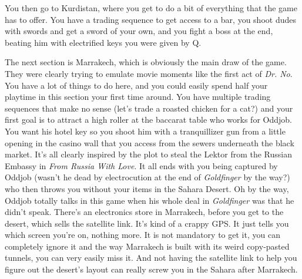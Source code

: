 \documentclass{book}
\begin{document}
You then go to Kurdistan, where you get to do a bit of everything that the game has to offer. You have a trading sequence to get access to a bar, you shoot dudes with swords and get a sword of your own, and you fight a boss at the end, beating him with electrified keys you were given by Q.\par
\FloatBarrier\vspace{\baselineskip}\begin{figure}[H]\end{figure}
The next section is Marrakech, which is obviously the main draw of the game. They were clearly trying to emulate movie moments like the first act of \emph{Dr. No}. You have a lot of things to do here, and you could easily spend half your playtime in this section your first time around. You have multiple trading sequences that make no sense (let’s trade a roasted chicken for a cat?) and your first goal is to attract a high roller at the baccarat table who works for Oddjob. You want his hotel key so you shoot him with a tranquillizer gun from a little opening in the casino wall that you access from the sewers underneath the black market. It’s all clearly inspired by the plot to steal the Lektor from the Russian Embassy in \emph{From Russia With Love}. It all ends with you being captured by Oddjob (wasn’t he dead by electrocution at the end of \emph{Goldfinger} by the way?) who then throws you without your items in the Sahara Desert. Oh by the way, Oddjob totally talks in this game when his whole deal in \emph{Goldfinger} was that he didn’t speak. There’s an electronics store in Marrakech, before you get to the desert, which sells the satellite link. It’s kind of a crappy GPS. It just tells you which screen you’re on, nothing more. It is not mandatory to get it, you can completely ignore it and the way Marrakech is built with its weird copy-pasted tunnels, you can very easily miss it. And not having the satellite link to help you figure out the desert’s layout can really screw you in the Sahara after Marrakech.\par
\FloatBarrier\vspace{\baselineskip}\centering
\begin{minipage}{0.45\linewidth}\end{minipage}\vspace{2pt}
\begin{minipage}{0.45\linewidth}\end{minipage}
\end{document}
